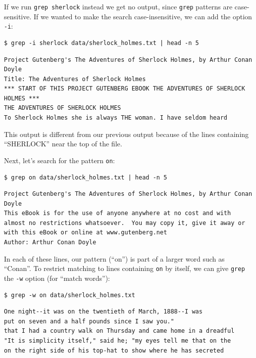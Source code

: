 \documentclass[
]{krantz}
\begin{document}
If we run \texttt{grep\ sherlock} instead we get no output,
since \texttt{grep} patterns are case-sensitive.
If we wanted to make the search case-insensitive,
we can add the option \texttt{-i}:

\begin{verbatim}
$ grep -i sherlock data/sherlock_holmes.txt | head -n 5
\end{verbatim}

\begin{verbatim}
Project Gutenberg's The Adventures of Sherlock Holmes, by Arthur Conan Doyle
Title: The Adventures of Sherlock Holmes
*** START OF THIS PROJECT GUTENBERG EBOOK THE ADVENTURES OF SHERLOCK HOLMES ***
THE ADVENTURES OF SHERLOCK HOLMES
To Sherlock Holmes she is always THE woman. I have seldom heard
\end{verbatim}

This output is different from our previous output
because of the lines containing ``SHERLOCK'' near the top of the file.

Next, let's search for the pattern \texttt{on}:

\begin{verbatim}
$ grep on data/sherlock_holmes.txt | head -n 5
\end{verbatim}

\begin{verbatim}
Project Gutenberg's The Adventures of Sherlock Holmes, by Arthur Conan Doyle
This eBook is for the use of anyone anywhere at no cost and with
almost no restrictions whatsoever.  You may copy it, give it away or
with this eBook or online at www.gutenberg.net
Author: Arthur Conan Doyle
\end{verbatim}

In each of these lines,
our pattern (``on'') is part of a larger word such as ``Conan''.
To restrict matching to lines containing \texttt{on} by itself,
we can give \texttt{grep} the \texttt{-w} option (for ``match words''):

\begin{verbatim}
$ grep -w on data/sherlock_holmes.txt
\end{verbatim}

\begin{verbatim}
One night--it was on the twentieth of March, 1888--I was
put on seven and a half pounds since I saw you."
that I had a country walk on Thursday and came home in a dreadful
"It is simplicity itself," said he; "my eyes tell me that on the
on the right side of his top-hat to show where he has secreted
\end{verbatim}
\end{document}
